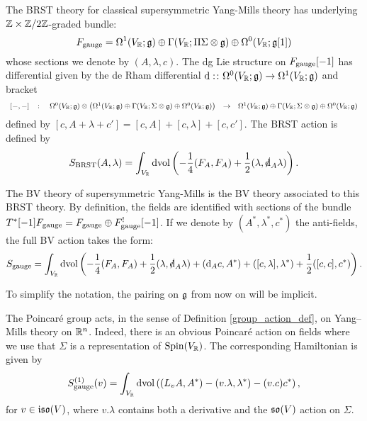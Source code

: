 \documentclass[10pt, oneside]{article}
\newcommand{\gauge}{\mathrm{gauge}}
\begin{document}
\begin{definition}
The BRST theory for classical supersymmetric Yang-Mills theory has underlying $\mathbb Z \times \mathbb Z/2\mathbb Z$-graded bundle:
\[
F_{\rm gauge} = \Omega^1(V_\mathbb R; \mathfrak g) \oplus \Gamma(V_\mathbb R; \Pi \Sigma \otimes \mathfrak g) \oplus \Omega^0(V_\mathbb R; \mathfrak g[1])
\]
whose sections we denote by $(A, \lambda, c)$.  
The dg Lie structure on $F_{\rm gauge}[-1]$ has differential given by the de Rham differential ${\rm d} :\colon \Omega^0(V_{\mathbb R} ; \mathfrak g) \to \Omega^1(V_{\mathbb R} ; \mathfrak g)$ and bracket
\[
\begin{array}{ccccccc}
[-,-] & \colon & \Omega^0(V_{\mathbb R} ; \mathfrak g) \otimes \left(\Omega^1(V_{\mathbb R} ; \mathfrak g) \oplus \Gamma(V_\mathbb R ; \Sigma \otimes \mathfrak g) \oplus \Omega^0(V_{\mathbb R} ; \mathfrak g) \right) & \to & \Omega^1(V_{\mathbb R} ; \mathfrak g) \oplus \Gamma(V_\mathbb R ; \Sigma \otimes \mathfrak g) \oplus \Omega^0(V_\mathbb R ; \mathfrak g)
\end{array}
\]
defined by $[c, A + \lambda + c'] = [c, A] + [c, \lambda] + [c,c']$.
The BRST action is defined by
\[
S_{\mr{BRST}}(A, \lambda) = \int_{V_\RR}\dvol \left( -\frac{1}{4} (F_A, F_A) + \frac{1}{2}(\lambda, \sd \d_A \lambda)\right).
\]
\end{definition}

The BV theory of supersymmetric Yang-Mills is the BV theory associated to this BRST theory. 
By definition, the fields are identified with sections of the bundle $T^*[-1] F_{\rm gauge} = F_{\rm gauge} \oplus F_{\rm gauge}^! [-1]$. 
If we denote by $(A^*, \lambda^*,c^*)$ the anti-fields, the full BV action takes the form:
\begin{equation}
S_{\gauge} = \int_{V_\RR}\dvol \left( -\frac{1}{4} (F_A, F_A) + \frac{1}{2}(\lambda, \sd\d_A \lambda) + (\d_A c, A^*) + ([c, \lambda], \lambda^*) + \frac{1}{2}([c, c], c^*)\right).
\label{eq:YMBVaction}
\end{equation}

To simplify the notation, the pairing on $\mathfrak g$ from now on will be implicit.

The Poincar\'e group acts, in the sense of Definition \ref{group_action_def}, on Yang--Mills theory on $\mathbb R^n$. Indeed, there is an obvious Poincar\'e action on fields where we use that $\Sigma$ is a representation of $\mathrm{Spin}(V_\mathbb R)$. The corresponding Hamiltonian is given by
\begin{equation}
S_{\gauge}^{(1)}(v) = \int_{V_\RR}\dvol\left( (L_{v}A, A^*) - (v.\lambda, \lambda^*) - (v.c)c^*\right),
\label{eq:YMPoincareaction}
\end{equation}
for $v\in\mathfrak{iso}(V)$, where $v.\lambda$ contains both a derivative and the $\mathfrak{so}(V)$ action on $\Sigma$.
\end{document}
